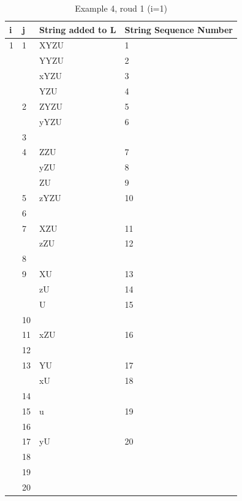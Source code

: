 \documentclass{sig-alternate-05-2015}
\begin{document}
\begin{table}[]
\centering
\caption{Example 4, roud 1 (i=1)}
\label{table:Example4Roud1}
\begin{tabular}{|l|l|l|l|}
\hline	
i & j  & String added to L & String Sequence Number \\
\hline
1 & 1  & XYZU              & 1                      \\
  &    & YYZU              & 2                      \\
  &    & xYZU              & 3                      \\
  &    & YZU               & 4                      \\
  & 2  & ZYZU              & 5                      \\
  &    & yYZU              & 6                      \\
  & 3  &                   &                        \\
  & 4  & ZZU               & 7                      \\
  &    & yZU               & 8                      \\
  &    & ZU                & 9                      \\
  & 5  & zYZU              & 10                     \\
  & 6  &                   &                        \\
  & 7  & XZU               & 11                     \\
  &    & zZU               & 12                     \\
  & 8  &                   &                        \\
  & 9  & XU                & 13                     \\
  &    & zU                & 14                     \\
  &    & U                 & 15                     \\
  & 10 &                   &                        \\
  & 11 & xZU               & 16                     \\
  & 12 &                   &                        \\
  & 13 & YU                & 17                     \\
  &    & xU                & 18                     \\
  & 14 &                   &                        \\
  & 15 & u                 & 19                     \\
  & 16 &                   &                        \\
  & 17 & yU                & 20                     \\
  & 18 &                   &                        \\
  & 19 &                   &                        \\
  & 20 &                   &            \\      
\hline
\end{tabular}
\end{table}
\end{document}
